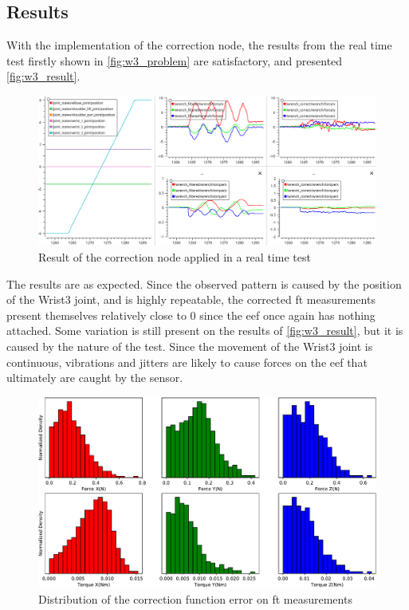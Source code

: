 


\subsection{Results}

\par With the implementation of the correction node, the results from the real time test firstly shown in \autoref{fig:w3_problem} are satisfactory, and presented \autoref{fig:w3_result}.

\begin{figure}[h]
    \centering
    \includegraphics[width=0.9\linewidth]{figs/chp3/wrist_3_result.png}
    \caption{Result of the correction node applied in a real time test}
    \label{fig:w3_result}
\end{figure}

\par The results are as expected. Since the observed pattern is caused by the position of the Wrist3 joint, and is highly repeatable, the corrected \ac{ft} measurements present themselves relatively close to 0 since the \ac{eef} once again has nothing attached. Some variation is still present on the results of \autoref{fig:w3_result}, but it is caused by the nature of the test. Since the movement of the Wrist3 joint is continuous, vibrations and jitters are likely to cause forces on the \ac{eef} that ultimately are caught by the sensor.

\begin{figure}[h]
    \centering
    \includegraphics[width=0.8\linewidth]{figs/chp3/wrist_3_result_hist.pdf}
    \caption{Distribution of the correction function error on \ac{ft} measurements}
    \label{fig:w3_result_hist}
\end{figure}

